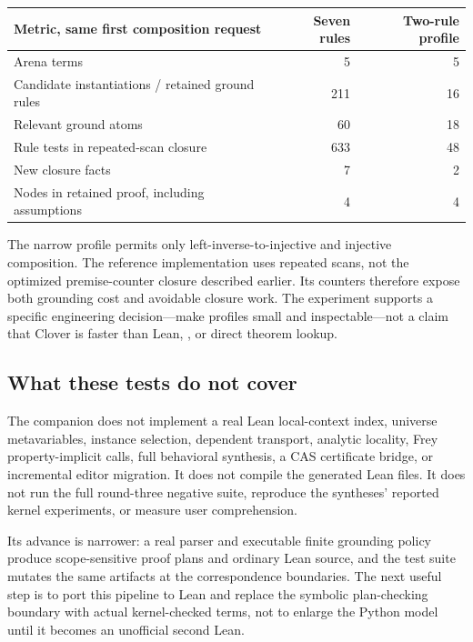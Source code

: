 \documentclass[11pt,a4paper]{article}
\newcommand{\code}[1]{\texttt{\detokenize{#1}}}
\theoremstyle{definition}
\theoremstyle{remark}
\begin{document}
\begin{center}\small
\begin{tabularx}{\textwidth}{@{}Yrr@{}}
\toprule
Metric, same first composition request & Seven rules & Two-rule profile\\\midrule
Arena terms & 5 & 5\\
Candidate instantiations / retained ground rules & 211 & 16\\
Relevant ground atoms & 60 & 18\\
Rule tests in repeated-scan closure & 633 & 48\\
New closure facts & 7 & 2\\
Nodes in retained proof, including assumptions & 4 & 4\\
\bottomrule
\end{tabularx}
\end{center}

The narrow profile permits only left-inverse-to-injective and injective
composition. The reference implementation uses repeated scans, not the optimized
premise-counter closure described earlier. Its counters therefore expose both
grounding cost and avoidable closure work. The experiment supports a specific
engineering decision---make profiles small and inspectable---not a claim that
Clover is faster than Lean, \code{fun_prop}, or direct theorem lookup.

\subsection{What these tests do not cover}

The companion does not implement a real Lean local-context index, universe
metavariables, instance selection, dependent transport, analytic locality,
Frey property-implicit calls, full behavioral synthesis, a CAS certificate
bridge, or incremental editor migration. It does not compile the generated
Lean files. It does not run the full round-three negative suite, reproduce the
syntheses' reported kernel experiments, or measure user comprehension.

Its advance is narrower: a real parser and executable finite grounding policy
produce scope-sensitive proof plans and ordinary Lean source, and the test suite
mutates the same artifacts at the correspondence boundaries. The next useful
step is to port this pipeline to Lean and replace the symbolic plan-checking
boundary with actual kernel-checked terms, not to enlarge the Python model
until it becomes an unofficial second Lean.
\end{document}
